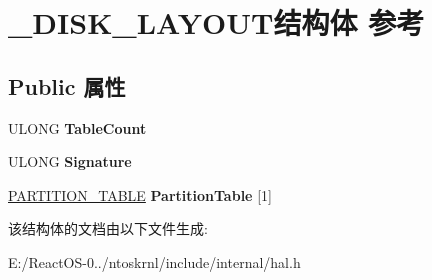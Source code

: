 \hypertarget{struct___d_i_s_k___l_a_y_o_u_t}{}\section{\+\_\+\+D\+I\+S\+K\+\_\+\+L\+A\+Y\+O\+U\+T结构体 参考}
\label{struct___d_i_s_k___l_a_y_o_u_t}
\subsection*{Public 属性}
\begin{DoxyCompactItemize}
\item 
\mbox{\label{struct___d_i_s_k___l_a_y_o_u_t_a42cf9ef9ef541ef32960704cccd67b71}} 
U\+L\+O\+NG {\bfseries Table\+Count}
\item 
\mbox{\label{struct___d_i_s_k___l_a_y_o_u_t_a3c06d5b2700a16db414ac3573f15981e}} 
U\+L\+O\+NG {\bfseries Signature}
\item 
\mbox{\label{struct___d_i_s_k___l_a_y_o_u_t_a6ce772454ac6f3f2360cec6d6ea24bc2}} 
\hyperlink{struct___p_a_r_t_i_t_i_o_n___t_a_b_l_e}{P\+A\+R\+T\+I\+T\+I\+O\+N\+\_\+\+T\+A\+B\+LE} {\bfseries Partition\+Table} \mbox{[}1\mbox{]}
\end{DoxyCompactItemize}


该结构体的文档由以下文件生成\+:\begin{DoxyCompactItemize}
\item 
E\+:/\+React\+O\+S-\/0../ntoskrnl/include/internal/hal.\+h\end{DoxyCompactItemize}
